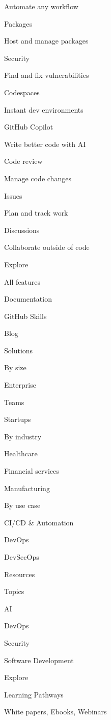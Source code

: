 \documentclass[
  letterpaper,
]{book}
\begin{document}
Automate any workflow

Packages

Host and manage packages

Security

Find and fix vulnerabilities

Codespaces

Instant dev environments

GitHub Copilot

Write better code with AI

Code review

Manage code changes

Issues

Plan and track work

Discussions

Collaborate outside of code

\label{product-explore-heading}{Explore}

All features

Documentation

GitHub Skills

Blog

Solutions

\label{solutions-by-size-heading}{By size}

Enterprise

Teams

Startups

\label{solutions-by-industry-heading}{By industry}

Healthcare

Financial services

Manufacturing

\label{solutions-by-use-case-heading}{By use case}

CI/CD \& Automation

DevOps

DevSecOps

Resources

\label{resources-topics-heading}{Topics}

AI

DevOps

Security

Software Development

\label{resources-explore-heading}{Explore}

Learning Pathways

White papers, Ebooks, Webinars
\end{document}
